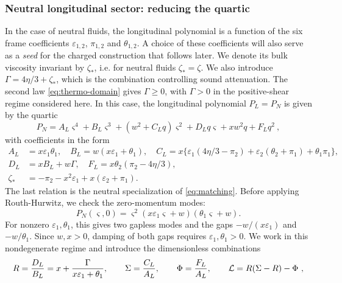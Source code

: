 \subsubsection{Neutral longitudinal sector: reducing the quartic}
In the case of neutral fluids, the longitudinal polynomial is a function of the six frame coefficients
$\varepsilon_{1,2}$, $\pi_{1,2}$ and $\theta_{1,2}$.
A choice of these coefficients will also serve as a \emph{seed} for
the charged construction that follows later. We denote its bulk viscosity invariant
by $\zeta_*$, i.e. for neutral fluids $\zeta_*=\zeta$. We also introduce
$\Gamma=4\eta/3+\zeta_*$, which is the combination controlling sound
attenuation. The second law \eqref{eq:thermo-domain} gives $\Gamma\geq0$,
with $\Gamma>0$ in the positive-shear regime considered here. In this case, the longitudinal polynomial $P_L=P_N$ is given by the quartic
\begin{equation}\label{eq:neutral-sound-polynomial}
 P_N=A_L\varsigma^4+B_L\varsigma^3+(w^2+C_Lq)\varsigma^2+D_Lq\varsigma+xw^2q+F_Lq^2~,
\end{equation}
with coefficients in the form
\begin{align}
 A_L&=x\varepsilon_1\theta_1, \quad B_L=w(x\varepsilon_1+\theta_1), \quad C_L=x\{\varepsilon_1(4\eta/3-\pi_2)+\varepsilon_2(\theta_2+\pi_1)+\theta_1\pi_1\},\nonumber\\
 D_L&=xB_L+w\Gamma,\quad F_L=x\theta_2(\pi_2-4\eta/3),\label{eq:quartic-data}\\
\zeta_*&= -\pi_2-x^2\varepsilon_1+x(\varepsilon_2+\pi_1). \nonumber
\end{align}
The last relation is the neutral specialization of \eqref{eq:matching}.
Before applying Routh-Hurwitz, we check the zero-momentum modes:
\begin{equation}\label{eq:neutral-rest-gaps}
 P_N(\varsigma,0)=\varsigma^2(x\varepsilon_1\varsigma+w)
                                  (\theta_1\varsigma+w).
\end{equation}
For nonzero $\varepsilon_1,\theta_1$, this gives two gapless modes and the
gaps $-w/(x\varepsilon_1)$ and $-w/\theta_1$. Since $w,x>0$, damping of
both gaps requires $\varepsilon_1,\theta_1>0$.
We work in this nondegenerate regime and introduce the dimensionless combinations
\begin{equation}\label{eq:invariants}
 R=\frac{D_L}{B_L}=x+\frac{\Gamma}{x\varepsilon_1+\theta_1},\qquad
 \Sigma=\frac{C_L}{A_L},\qquad\Phi=\frac{F_L}{A_L},\qquad
 \mathcal L=R(\Sigma-R)-\Phi~,
\end{equation}
